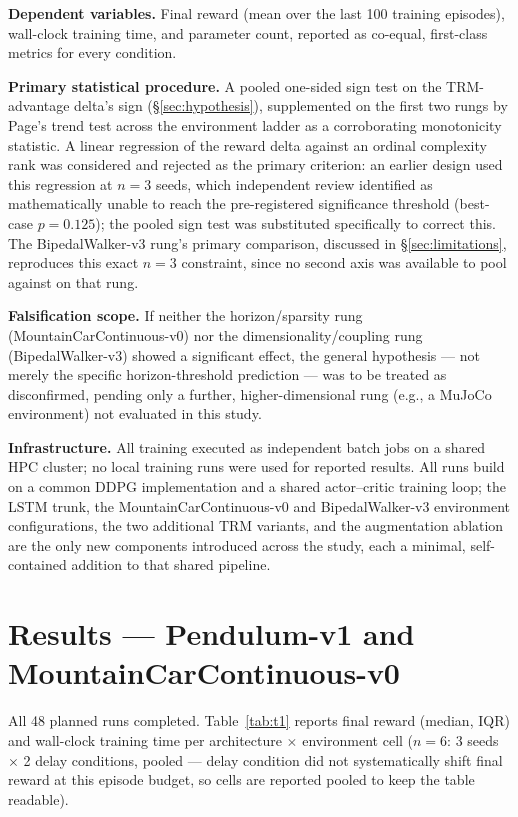 \documentclass[11pt]{article}
\begin{document}
\textbf{Dependent variables.} Final reward (mean over the last 100 training episodes), wall-clock training time, and parameter count, reported as co-equal, first-class metrics for every condition.

\textbf{Primary statistical procedure.} A pooled one-sided sign test on the TRM-advantage delta's sign (\S\ref{sec:hypothesis}), supplemented on the first two rungs by Page's trend test across the environment ladder as a corroborating monotonicity statistic. A linear regression of the reward delta against an ordinal complexity rank was considered and rejected as the primary criterion: an earlier design used this regression at $n=3$ seeds, which independent review identified as mathematically unable to reach the pre-registered significance threshold (best-case $p=0.125$); the pooled sign test was substituted specifically to correct this. The BipedalWalker-v3 rung's primary comparison, discussed in \S\ref{sec:limitations}, reproduces this exact $n=3$ constraint, since no second axis was available to pool against on that rung.

\textbf{Falsification scope.} If neither the horizon/sparsity rung (MountainCarContinuous-v0) nor the dimensionality/coupling rung (BipedalWalker-v3) showed a significant effect, the general hypothesis --- not merely the specific horizon-threshold prediction --- was to be treated as disconfirmed, pending only a further, higher-dimensional rung (e.g., a MuJoCo environment) not evaluated in this study.

\textbf{Infrastructure.} All training executed as independent batch jobs on a shared HPC cluster; no local training runs were used for reported results. All runs build on a common DDPG implementation and a shared actor--critic training loop; the LSTM trunk, the MountainCarContinuous-v0 and BipedalWalker-v3 environment configurations, the two additional TRM variants, and the augmentation ablation are the only new components introduced across the study, each a minimal, self-contained addition to that shared pipeline.

\section{Results --- Pendulum-v1 and MountainCarContinuous-v0}
\label{sec:results1}

All 48 planned runs completed. Table~\ref{tab:t1} reports final reward (median, IQR) and wall-clock training time per architecture $\times$ environment cell ($n=6$: 3 seeds $\times$ 2 delay conditions, pooled --- delay condition did not systematically shift final reward at this episode budget, so cells are reported pooled to keep the table readable).
\end{document}

